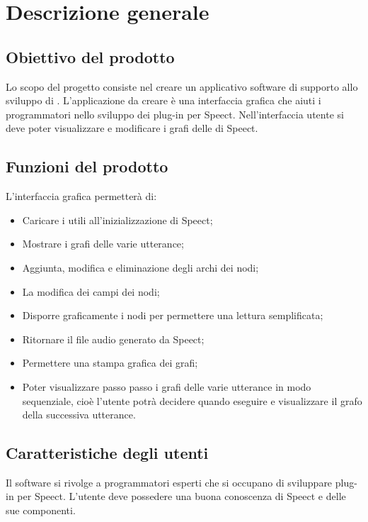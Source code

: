 \documentclass[../AnalisideiRequisiti.tex]{subfiles}
\begin{document}
	
\chapter{Descrizione generale}

\section{Obiettivo del prodotto}

Lo scopo del progetto consiste nel creare un applicativo software di supporto allo sviluppo di . L’applicazione da creare è una interfaccia grafica che aiuti i programmatori nello sviluppo dei plug-in per Speect. Nell’interfaccia utente si deve poter visualizzare e modificare i grafi delle  di Speect. 


\section{Funzioni del prodotto}
L’interfaccia grafica permetterà di:
\begin{itemize}
	\item{} Caricare i  utili all’inizializzazione di Speect;
	\item{} Mostrare i grafi delle varie utterance;
	\item{} Aggiunta, modifica e eliminazione degli archi dei nodi;
	\item{} La modifica dei campi dei nodi;
	\item{} Disporre graficamente i nodi per permettere una lettura semplificata;
	\item{} Ritornare il file audio generato da Speect;
	\item{} Permettere una stampa grafica dei grafi;
	\item{} Poter visualizzare passo passo i grafi delle varie utterance in modo sequenziale, cioè l’utente potrà decidere quando eseguire e visualizzare il grafo della successiva utterance.	
\end{itemize}


\section{Caratteristiche degli utenti}
Il software si rivolge a programmatori esperti che si occupano di sviluppare plug-in per Speect. L'utente deve possedere una buona conoscenza di Speect e delle sue componenti.
\end{document}
